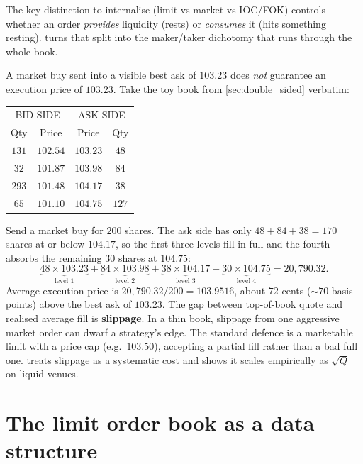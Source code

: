 The key distinction to internalise (limit vs market vs IOC/FOK)
controls whether an order \emph{provides} liquidity (rests) or
\emph{consumes} it (hits something resting). 
turns that split into the maker/taker dichotomy that runs through the
whole book.

\begin{pitfallbox}
A market buy sent into a visible best ask of $103.23$ does \emph{not}
guarantee an execution price of $103.23$. Take the toy book from
\cref{sec:double_sided} verbatim:
\begin{center}
\begin{tabular}{cc|cc}
\toprule
\multicolumn{2}{c|}{BID SIDE} & \multicolumn{2}{c}{ASK SIDE} \\
Qty & Price & Price & Qty \\
\midrule
$131$ & $102.54$ & $103.23$ & $48$  \\
$32$  & $101.87$ & $103.98$ & $84$  \\
$293$ & $101.48$ & $104.17$ & $38$  \\
$65$  & $101.10$ & $104.75$ & $127$ \\
\bottomrule
\end{tabular}
\end{center}
Send a market buy for $200$ shares. The ask side has only $48 + 84 +
38 = 170$ shares at or below $104.17$, so the first three levels fill
in full and the fourth absorbs the remaining $30$ shares at $104.75$:
\[
\underbrace{48 \times 103.23}_{\text{level 1}} +
\underbrace{84 \times 103.98}_{\text{level 2}} +
\underbrace{38 \times 104.17}_{\text{level 3}} +
\underbrace{30 \times 104.75}_{\text{level 4}}
= 20{,}790.32.
\]
Average execution price is $20{,}790.32 / 200 = 103.9516$, about $72$
cents ($\sim 70$ basis points) above the best ask of $103.23$. The
gap between top-of-book quote and realised average fill is
\textbf{slippage}. In a thin book, slippage from one aggressive market
order can dwarf a strategy's edge. The standard defence is a
marketable limit with a price cap (e.g.\ $103.50$), accepting a
partial fill rather than a bad full one. 
treats slippage as a systematic cost and shows it scales empirically
as $\sqrt{Q}$ on liquid venues.
\end{pitfallbox}

\section{The limit order book as a data structure}
\label{sec:lob_ds}

